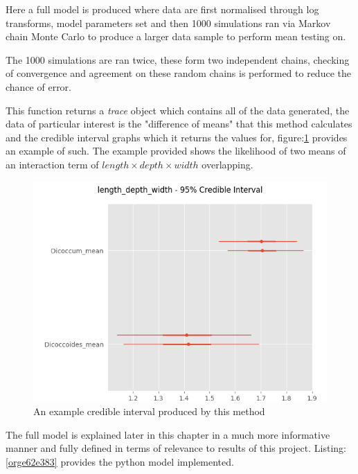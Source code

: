 \documentclass[11pt]{report}
\begin{document}
Here a full model is produced where data are first normalised through log transforms, model parameters set and then 1000 simulations ran via Markov chain Monte Carlo to produce a larger data sample to perform mean testing on.

The 1000 simulations are ran twice, these form two independent chains, checking of convergence and agreement on these random chains is performed to reduce the chance of error.

This function returns a \emph{trace} object which contains all of the data generated, the data of particular interest is the "difference of means" that this method calculates and the credible interval graphs which it returns the values for, figure:\ref{fig:org9a3e8ea} provides an example of such. The example provided shows the likelihood of two means of an interaction term of
\(length \times  depth \times width\) overlapping.

\begin{figure}[htbp]
\centering
\includegraphics[width=15cm]{./images/ci.png}
\caption{\label{fig:org9a3e8ea}
An example credible interval produced by this method}
\end{figure}


The full model is explained later in this chapter in a much more informative manner and fully defined in terms of relevance to results of this project. Listing:\ref{orge62e383} provides the python model implemented.
\end{document}
